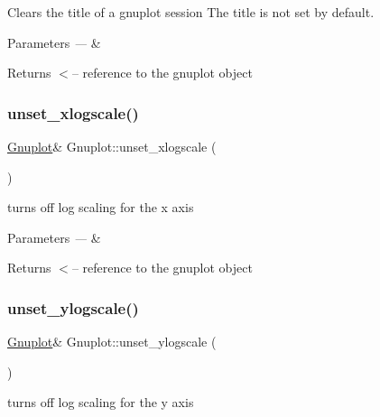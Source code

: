 Clears the title of a gnuplot session The title is not set by default. 


\begin{DoxyParams}{Parameters}
{\em ---} & \\
\hline
\end{DoxyParams}
\begin{DoxyReturn}{Returns}
$<$-- reference to the gnuplot object 
\end{DoxyReturn}
\mbox{\label{class_gnuplot_a7b178184260f1498cd0c11a197ea0ac2}} 
\subsubsection{\texorpdfstring{unset\+\_\+xlogscale()}{unset\_xlogscale()}}
{\footnotesize\ttfamily \mbox{\hyperlink{class_gnuplot}{Gnuplot}}\& Gnuplot\+::unset\+\_\+xlogscale (\begin{DoxyParamCaption}{ }\end{DoxyParamCaption})\hspace{0.3cm}{\ttfamily [inline]}}

turns off log scaling for the x axis


\begin{DoxyParams}{Parameters}
{\em ---} & \\
\hline
\end{DoxyParams}
\begin{DoxyReturn}{Returns}
$<$-- reference to the gnuplot object 
\end{DoxyReturn}
\mbox{\label{class_gnuplot_a9217543dd49c4802b1194d42c5e10b6d}} 
\subsubsection{\texorpdfstring{unset\+\_\+ylogscale()}{unset\_ylogscale()}}
{\footnotesize\ttfamily \mbox{\hyperlink{class_gnuplot}{Gnuplot}}\& Gnuplot\+::unset\+\_\+ylogscale (\begin{DoxyParamCaption}{ }\end{DoxyParamCaption})\hspace{0.3cm}{\ttfamily [inline]}}

turns off log scaling for the y axis



